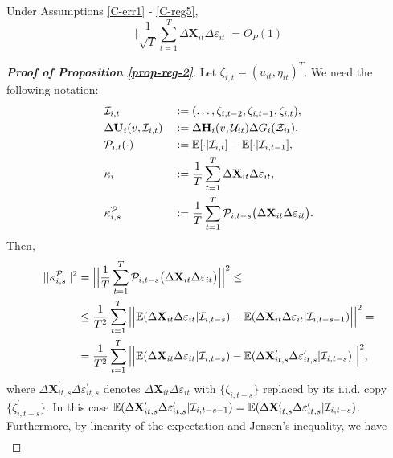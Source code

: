 \documentclass[a4paper,12pt]{article}
\begin{document}
\begin{prop}\label{prop-reg-2}
Under Assumptions \ref{C-err1} - \ref{C-reg5},
\[ \Big| \frac{1}{\sqrt{T}}\sum_{t=1}^T \Delta \mathbf{X}_{it}\Delta \varepsilon_{it} \Big| = O_P(1)
\]
\end{prop}
\begin{proof}[\textnormal{\textbf{Proof of Proposition \ref{prop-reg-2}}}]
Let $\zeta_{i,t} = (u_{it}, \eta_{it})^T$. We need the following notation:
\begin{alignat*}{2}
&\mathcal{I}_{i,t} &&:= (\ldots, \zeta_{i, t-2}, \zeta_{i, t-1}, \zeta_{i,t}),\\
&\Delta \mathbf{U}_i(v, \mathcal{I}_{i, t}) &&:= \Delta \mathbf{H}_i(v, \mathcal{U}_{it}) \Delta G_i(\mathcal{Z}_{it}),\\
&\mathcal{P}_{i,t}(\cdot) &&:= \mathbb{E}[\cdot|\mathcal{I}_{i, t}] -\mathbb{E}[\cdot|\mathcal{I}_{i, t-1}], \\
&\kappa_{i} && := \frac{1}{T}\sum_{t=1}^T  \Delta \mathbf{X}_{it}\Delta \varepsilon_{it}, \\
&\kappa_{i, s}^{\mathcal{P}} && := \frac{1}{T}\sum_{t=1}^T \mathcal{P}_{i, t-s}\big( \Delta \mathbf{X}_{it}\Delta \varepsilon_{it}\big).
\end{alignat*}
Then,
\begin{align*}
||\kappa_{i, s}^{\mathcal{P}}||^2 &= \Big|\Big| \frac{1}{T}\sum_{t=1}^T \mathcal{P}_{i, t-s}\big( \Delta \mathbf{X}_{it}\Delta \varepsilon_{it}\big) \Big|\Big|^2 \leq\\
&\leq \frac{1}{T^2} \sum_{t=1}^T \Big|\Big| \mathbb{E} (\Delta \mathbf{X}_{it}\Delta \varepsilon_{it}|\mathcal{I}_{i, t-s}) -\mathbb{E} (\Delta \mathbf{X}_{it}\Delta \varepsilon_{it}|\mathcal{I}_{i, t-s-1}) \Big|\Big|^2 =\\
&= \frac{1}{T^2} \sum_{t=1}^T \Big|\Big| \mathbb{E} (\Delta \mathbf{X}_{it}\Delta \varepsilon_{it}|\mathcal{I}_{i, t-s}) -\mathbb{E} (\Delta \mathbf{X}_{it, s}^\prime\Delta \varepsilon_{it, s}^\prime|\mathcal{I}_{i, t-s}) \Big|\Big|^2,
\end{align*}
where $\Delta \mathbf{X}_{it, s}^\prime\Delta \varepsilon_{it, s}^\prime$ denotes $\Delta \mathbf{X}_{it}\Delta \varepsilon_{it}$ with $\{\zeta_{i, t-s}\}$ replaced by its i.i.d. copy $\{\zeta_{i, t-s}^\prime\}$. In this case $\mathbb{E} (\Delta \mathbf{X}_{it, s}^\prime\Delta \varepsilon_{it, s}^\prime|\mathcal{I}_{i, t-s -1}) = \mathbb{E} (\Delta \mathbf{X}_{it, s}^\prime\Delta \varepsilon_{it, s}^\prime|\mathcal{I}_{i, t-s})$. Furthermore, by linearity of the expectation and Jensen's inequality, we have 
\begin{align*}

\end{align*}
\end{proof}
\end{document}
